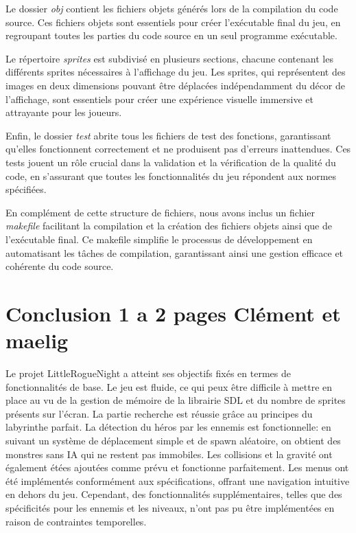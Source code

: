 \documentclass[10pt]{article}
\begin{document}
Le dossier \textit{obj} contient les fichiers objets générés lors de la compilation du code source. Ces fichiers objets sont essentiels pour créer l'exécutable final du jeu, en regroupant toutes les parties du code source en un seul programme exécutable.

Le répertoire \textit{sprites} est subdivisé en plusieurs sections, chacune contenant les différents sprites nécessaires à l'affichage du jeu. Les sprites, qui représentent des images en deux dimensions pouvant être déplacées indépendamment du décor de l'affichage, sont essentiels pour créer une expérience visuelle immersive et attrayante pour les joueurs.

Enfin, le dossier \textit{test} abrite tous les fichiers de test des fonctions, garantissant qu'elles fonctionnent correctement et ne produisent pas d'erreurs inattendues. Ces tests jouent un rôle crucial dans la validation et la vérification de la qualité du code, en s'assurant que toutes les fonctionnalités du jeu répondent aux normes spécifiées.

En complément de cette structure de fichiers, nous avons inclus un fichier \textit{makefile} facilitant la compilation et la création des fichiers objets ainsi que de l'exécutable final. Ce makefile simplifie le processus de développement en automatisant les tâches de compilation, garantissant ainsi une gestion efficace et cohérente du code source.

   
\section{Conclusion 1 a 2 pages Clément et maelig}

Le projet LittleRogueNight a atteint ses objectifs fixés en termes de fonctionnalités de base. Le jeu est fluide, ce qui peux être difficile à mettre en place au vu de la gestion de mémoire de la librairie SDL et du nombre de sprites présents sur l'écran. La partie recherche est réussie grâce au principes du labyrinthe parfait. La détection du héros par les ennemis est fonctionnelle: en suivant un système de déplacement simple et de spawn aléatoire, on obtient des monstres sans IA qui ne restent pas immobiles. Les collisions et la gravité ont également étées ajoutées comme prévu et fonctionne parfaitement. Les menus ont été implémentés conformément aux spécifications, offrant une navigation intuitive en dehors du jeu. Cependant, des fonctionnalités supplémentaires, telles que des spécificités pour les ennemis et les niveaux, n'ont pas pu être implémentées en raison de contraintes temporelles.\\
\end{document}

